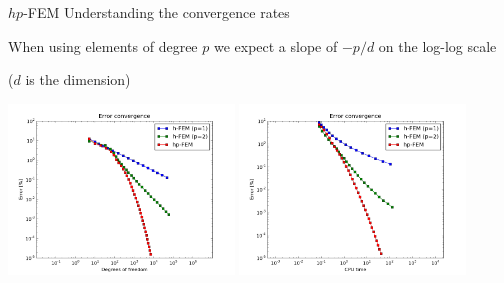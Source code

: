\begin{frame}{$hp$-FEM}
  {Understanding the convergence rates}
  
  \scriptsize

    When using elements of degree $ p $ we expect a slope of $ - p/d $ on the log-log scale
    
    ($ d $ is the dimension)

    \includegraphics[width=6cm]{figures/conv_dof15}
    \includegraphics[width=6cm]{figures/conv_cpu15}
    

\end{frame}


